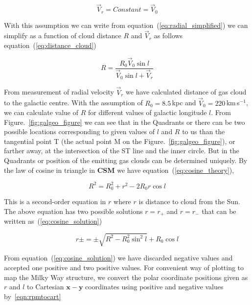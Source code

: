 \documentclass[10pt,conference]{IEEEtran}
\begin{document}
\begin{equation}
 \vec{V}_{r}=Constant=\vec{V}_{0}
 \label{eq:radial_constant}
\end{equation}

With this assumption we can write from equation~(\ref{eq:radial_simplified}) we can simplify as a function of cloud distance $\mathit{R}$ and $\vec{V}_{r}$  as follows equation~(\ref{eq:distance_cloud})

\begin{equation}
 \mathit{R}=\frac{\mathit{R}_{0}\vec{V}_{0}\sin l}{\vec{V}_{0}\sin l+\vec{V}_{r}}
 \label{eq:distance_cloud}
\end{equation}

From measurement of radial velocity $\vec{V}_{r}$ we have calculated distance of gas cloud to the galactic centre. With the assumption of $\mathit{R}_{0}=8.5$\,kpc and $\vec{V}_{0}=220$\,km\,s$^{-1}$, we can calculate value of $\mathit{R}$ for different values of galactic longitude $\mathit{l}$. From Figure.~\ref{fig:galgeo_figure} we can see that in the Quadrants  or  there can be two possible locations corresponding to given values of $\mathit{l}$ and $\mathit{R}$ to us than the tangential point T (the actual point M on the Figure.~\ref{fig:galgeo_figure}), or farther away, at the intersection of the ST line and the inner circle. But in the Quadrants  or  position of the emitting gas clouds can be determined uniquely\cite{CathyHorellou2015}. By the law of cosine in triangle in \textbf{CSM} we have equation~(\ref{eq:cosine_theory}),

\begin{equation}
 \mathit{R}^{2}=\mathit{R}_{0}^{2}+\mathit{r}^{2}-2\mathit{R}_{0}\mathit{r}\cos l
 \label{eq:cosine_theory}
\end{equation}

This is a second-order equation in $\mathit{r}$ where $\mathit{r}$ is distance to cloud from the Sun. The above equation has two possible solutions $\mathit{r}=\mathit{r}_{+}$ and $\mathit{r}=\mathit{r}_{-}$ that can be written as~(\ref{eq:cosine_solution})

\begin{equation}
 \mathit{r}\pm=\pm\sqrt{\mathit{R}^{2}-\mathit{R}_{0}^{2}\sin^{2} l}+\mathit{R}_{0}\cos l
 \label{eq:cosine_solution}
\end{equation}

From equation~(\ref{eq:cosine_solution}) we have discarded negative values and accepted one positive and two positive values. For convenient way of plotting to map the Milky Way structure, we convert the polar coordinate positions given as $\mathit{r}$ and $\mathit{l}$ to Cartesian $\mathbf{x-y}$ coordinates using positive and negative values by~\ref{eqn:rpmtocart}
\end{document}

